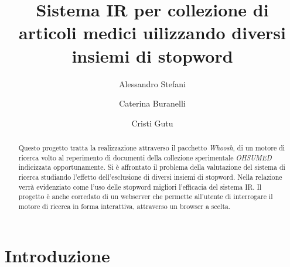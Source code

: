 \documentclass[runningheads]{llncs}
\begin{document}
%
\title{Sistema IR per collezione di articoli medici uilizzando diversi insiemi di stopword}
%
%
\author{%
  Alessandro Stefani \and
  Caterina Buranelli \and
  Cristi Gutu}
%
%
%
\maketitle
%
\begin{abstract}
Questo progetto tratta la realizzazione attraverso il pacchetto \emph{Whoosh}, di un motore di ricerca
volto al reperimento di documenti della collezione sperimentale \emph{OHSUMED} indicizzata opportunamente.
Si \`e affrontato il problema della valutazione del sistema di ricerca studiando l'effetto dell'esclusione
di diversi insiemi di stopword. Nella relazione verr\`a evidenziato come l'uso delle stopword migliori l'efficacia
del sistema IR.
Il progetto \`e anche corredato di un webserver che permette all'utente di interrogare il motore di ricerca
in forma interattiva, attraverso un browser a scelta.
\end{abstract}

\section{Introduzione}
\label{sec:introduzione}
\end{document}

